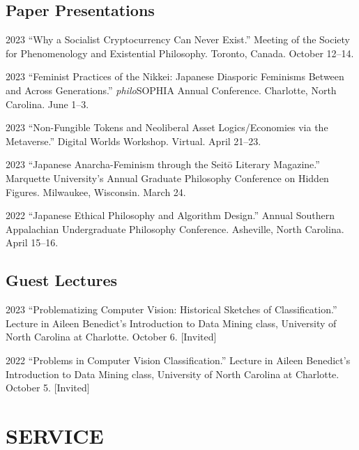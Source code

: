 \documentclass{article}
\begin{document}
\subsection*{\normalsize{Paper Presentations}}
\begin{tablist}
    \item[2023] \tab{}\enquote{Why a Socialist Cryptocurrency Can Never Exist.}  Meeting of the Society for Phenomenology and Existential Philosophy. Toronto, Canada. October 12--14.
    \item[2023] \tab{}\enquote{Feminist Practices of the Nikkei: Japanese Diasporic Feminisms Between and Across Generations.} \textit{philo}SOPHIA  Annual Conference. Charlotte, North Carolina. June 1--3.
    \item[2023] \tab{}\enquote{Non-Fungible Tokens and Neoliberal Asset Logics/Economies via the Metaverse.} Digital Worlds Workshop. Virtual. April 21--23.
    \item[2023] \tab{}\enquote{Japanese Anarcha-Feminism through the Seitō Literary Magazine.} Marquette University's Annual Graduate Philosophy Conference on Hidden Figures. Milwaukee, Wisconsin. March 24.
    \item[2022] \tab{}\enquote{Japanese Ethical Philosophy and Algorithm Design.}  Annual Southern Appalachian Undergraduate Philosophy Conference. Asheville, North Carolina. April 15--16.
\end{tablist}
\subsection*{\normalsize{Guest Lectures}}
\begin{tablist}
    \item[2023] \tab{}\enquote{Problematizing Computer Vision: Historical Sketches of Classification.} Lecture in Aileen Benedict's Introduction to Data Mining class, University of North Carolina at Charlotte. October 6. [Invited]
    \item[2022] \tab{}\enquote{Problems in Computer Vision Classification.} Lecture in Aileen Benedict's Introduction to Data Mining class, University of North Carolina at Charlotte. October 5. [Invited]
\end{tablist}

\section*{\normalsize{\MakeUppercase{Service}}}
\end{document}
